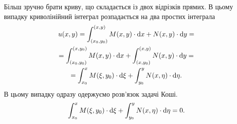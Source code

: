 Більш зручно брати криву, що складається із двох відрізків прямих. В цьому випадку криволінійний інтеграл розпадається на два простих інтеграла
\begin{multline}
	u(x, y) = \int_{(x_0, y_0)}^{(x,y)} M(x,y) \cdot \mathop{}\!\mathrm{d} x + N(x, y) \cdot \mathop{}\!\mathrm{d} y = \\
	= \int_{(x_0, y_0)}^{(x,y_0)} M(x,y) \cdot \mathop{}\!\mathrm{d} x + \int_{(x,y_0)}^{(x,y)} N(x, y) \cdot \mathop{}\!\mathrm{d} y = \\
	= \int_{x_0}^{x} M(\xi,y_0) \cdot \mathop{}\!\mathrm{d} \xi + \int_{y_0}^{y} N(x, \eta) \cdot \mathop{}\!\mathrm{d} \eta.
\end{multline}
В цьому випадку одразу одержуємо розв’язок задачі Коші.
\begin{equation*}
	\int_{x_0}^{x} M(\xi,y_0) \cdot \mathop{}\!\mathrm{d} \xi + \int_{y_0}^{y} N(x, \eta) \cdot \mathop{}\!\mathrm{d} \eta = 0.
\end{equation*}
